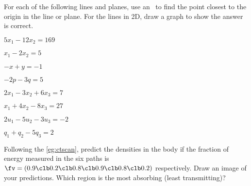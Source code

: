 
\begin{exercise}  
For each of the following lines and planes,
use an \svd\ to find the point closest to the origin in the line or plane.
For the lines in 2D, draw a graph to show the answer is correct.
\begin{Parts}
\item \(5x_1-12x_2=169\)

\item \(x_1-2x_2=5\)

\begin{reduce}
\item \(-x+y=-1\)

\item \(-2p-3q=5\)
\end{reduce}

\item \(2x_1-3x_2+6x_3=7\)

\begin{reduce}
\item \(x_1+4x_2-8x_3=27\)

\item \(2u_1-5u_2-3u_3=-2\)
\end{reduce}

\item \(q_1+q_2-5q_3=2\)

\end{Parts}
\end{exercise}



\begin{exercise}  
Following the  \autoref{eg:ctscan}, predict the densities in the body if the fraction of  energy measured in the six paths is \(\fv=(0.9\clb 0.2\clb 0.8\clb 0.9\clb 0.8\clb 0.2)\) respectively.  
Draw an image of your predictions.  Which region is the most absorbing (least transmitting)?
\end{exercise}




